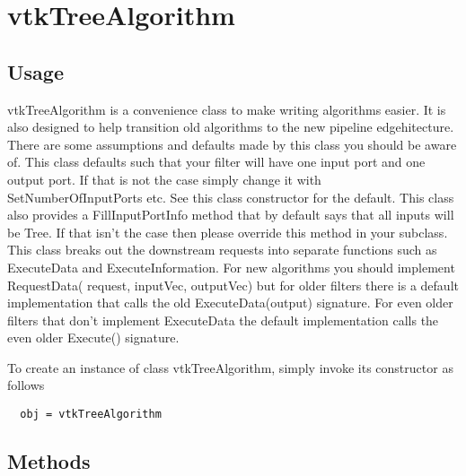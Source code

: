 \section{vtkTreeAlgorithm}

\subsection{Usage}

 vtkTreeAlgorithm is a convenience class to make writing algorithms
 easier. It is also designed to help transition old algorithms to the new
 pipeline edgehitecture. There are some assumptions and defaults made by this
 class you should be aware of. This class defaults such that your filter
 will have one input port and one output port. If that is not the case
 simply change it with SetNumberOfInputPorts etc. See this class
 constructor for the default. This class also provides a FillInputPortInfo
 method that by default says that all inputs will be Tree. If that
 isn't the case then please override this method in your subclass. This
 class breaks out the downstream requests into separate functions such as
 ExecuteData and ExecuteInformation.  For new algorithms you should
 implement RequestData( request, inputVec, outputVec) but for older filters
 there is a default implementation that calls the old ExecuteData(output)
 signature. For even older filters that don't implement ExecuteData the
 default implementation calls the even older Execute() signature.

To create an instance of class vtkTreeAlgorithm, simply
invoke its constructor as follows
\begin{verbatim}
  obj = vtkTreeAlgorithm
\end{verbatim}
\subsection{Methods}

